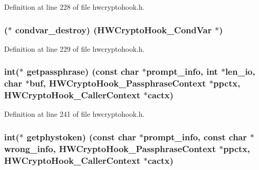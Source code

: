 Definition at line 228 of file hwcryptohook.\+h.

\subsubsection[{\texorpdfstring{condvar\+\_\+destroy}{condvar_destroy}}]{($\ast$ condvar\+\_\+destroy) ({\bf H\+W\+Crypto\+Hook\+\_\+\+Cond\+Var} $\ast$)}\hypertarget{struct_h_w_crypto_hook___init_info_afee31feed192090c39cc176b1ddd9098}{}\label{struct_h_w_crypto_hook___init_info_afee31feed192090c39cc176b1ddd9098}


Definition at line 229 of file hwcryptohook.\+h.

\subsubsection[{\texorpdfstring{getpassphrase}{getpassphrase}}]{\setlength{\rightskip}{0pt plus 5cm}int($\ast$ getpassphrase) (const char $\ast$prompt\+\_\+info, int $\ast$len\+\_\+io, char $\ast$buf, {\bf H\+W\+Crypto\+Hook\+\_\+\+Passphrase\+Context} $\ast$ppctx, {\bf H\+W\+Crypto\+Hook\+\_\+\+Caller\+Context} $\ast$cactx)}\hypertarget{struct_h_w_crypto_hook___init_info_a3dba8089573c851497dfa4b1da1a3843}{}\label{struct_h_w_crypto_hook___init_info_a3dba8089573c851497dfa4b1da1a3843}


Definition at line 241 of file hwcryptohook.\+h.

\subsubsection[{\texorpdfstring{getphystoken}{getphystoken}}]{\setlength{\rightskip}{0pt plus 5cm}int($\ast$ getphystoken) (const char $\ast$prompt\+\_\+info, const char $\ast$wrong\+\_\+info, {\bf H\+W\+Crypto\+Hook\+\_\+\+Passphrase\+Context} $\ast$ppctx, {\bf H\+W\+Crypto\+Hook\+\_\+\+Caller\+Context} $\ast$cactx)}\hypertarget{struct_h_w_crypto_hook___init_info_a7474c7ad94f0af9db90b59c4af04b8a3}{}\label{struct_h_w_crypto_hook___init_info_a7474c7ad94f0af9db90b59c4af04b8a3}



